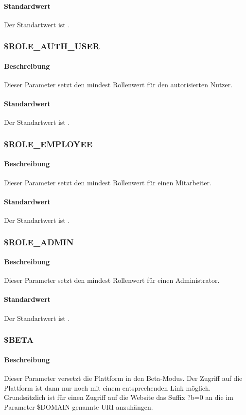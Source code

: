 \paragraph{Standardwert}Der Standartwert ist {\grqq}.

\subsubsection{\$ROLE\_AUTH\_USER}
\paragraph{Beschreibung}Dieser Parameter setzt den mindest Rollenwert für den autorisierten Nutzer.
\paragraph{Standardwert}Der Standartwert ist {\grqq}.

\subsubsection{\$ROLE\_EMPLOYEE}
\paragraph{Beschreibung}Dieser Parameter setzt den mindest Rollenwert für einen Mitarbeiter.
\paragraph{Standardwert}Der Standartwert ist {\grqq}.

\subsubsection{\$ROLE\_ADMIN}
\paragraph{Beschreibung}Dieser Parameter setzt den mindest Rollenwert für einen Administrator.
\paragraph{Standardwert}Der Standartwert ist {\grqq}.

\subsubsection{\$BETA}
\paragraph{Beschreibung}Dieser Parameter versetzt die Plattform in den Beta-Modus. Der Zugriff auf die Plattform ist dann nur noch mit einem entsprechenden Link möglich. Grundsätzlich ist für einen Zugriff auf die Website das Suffix {\glqq ?b=0\grqq} an die im Parameter {\glqq \$DOMAIN\grqq} genannte URI anzuhängen.
